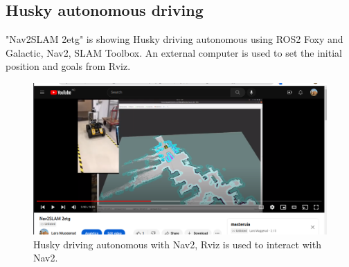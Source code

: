 \subsection{Husky autonomous driving}
"Nav2SLAM 2etg" \label{Nav2SLAM 2etg} is showing Husky driving autonomous using ROS2 Foxy and Galactic, Nav2, SLAM Toolbox. An external computer is used to set the initial position and goals from Rviz. 

\begin{figure}[H]
    \centering
    \includegraphics[width=\textwidth]{Figures/YouTube/Nav2SLAM 2etg.png}
    \caption{Husky driving autonomous with Nav2, Rviz is used to interact with Nav2.}
    \label{fig:Nav2SLAM 2etg}
\end{figure}

